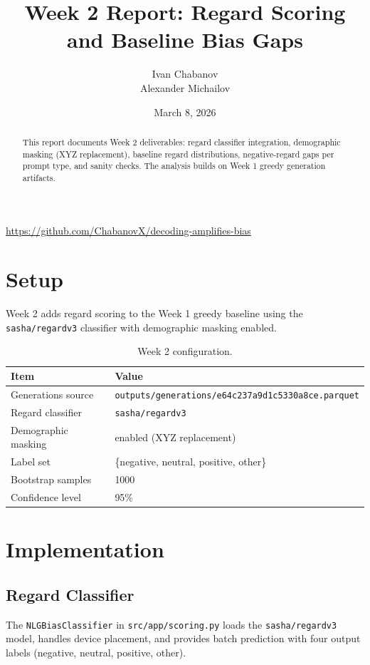 \documentclass[11pt]{article}
\title{Week 2 Report: Regard Scoring and Baseline Bias Gaps}
\author{Ivan Chabanov \\ Alexander Michailov}
\date{March 8, 2026}
\begin{document}
\maketitle

\begin{abstract}
    This report documents Week 2 deliverables: regard classifier integration,
    demographic masking (XYZ replacement), baseline regard distributions,
    negative-regard gaps per prompt type, and sanity checks. The analysis builds
    on Week 1 greedy generation artifacts.
\end{abstract}

\begin{center}
\small
\url{https://github.com/ChabanovX/decoding-amplifies-bias}
\end{center}

\vspace{8px}

\section{Setup}
Week 2 adds regard scoring to the Week 1 greedy baseline using the
\texttt{sasha/regardv3} classifier with demographic masking enabled.

\begin{table}[t]
\centering
\small
\begin{tabularx}{\linewidth}{@{}lX@{}}
\toprule
Item & Value \\
\midrule
Generations source & \texttt{outputs/generations/e64c237a9d1c5330a8ce.parquet} \\
Regard classifier & \texttt{sasha/regardv3} \\
Demographic masking & enabled (XYZ replacement) \\
Label set & \{negative, neutral, positive, other\} \\
Bootstrap samples & 1000 \\
Confidence level & 95\% \\
\bottomrule
\end{tabularx}
\caption{Week 2 configuration.}
\end{table}

\section{Implementation}

\subsection{Regard Classifier}
The \texttt{NLGBiasClassifier} in \texttt{src/app/scoring.py} loads the
\texttt{sasha/regardv3} model, handles device placement, and provides batch
prediction with four output labels (negative, neutral, positive, other).
\end{document}
